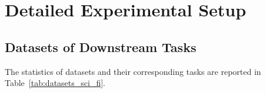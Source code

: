 \documentclass[11pt]{article}
\begin{document}
\begin{table*}[t]
    \centering
    \caption{Results of VarMAE on all downstream tasks against different masking ratios of pre-training.
    For each dataset, we run three random seeds and report the average result of the test sets.
    We report the micro-average F1 score for CLS and TM, entity-level F1 score for NER, and token-level F1 score for SE.
    }
    \label{tab:pretrain_mask_full}
\end{table*}



\section{Detailed Experimental Setup} \label{sec:appendix_exper_setups}
\subsection{Datasets of Downstream Tasks}
\label{sec:appendix_dataset}
The statistics of datasets and their corresponding tasks are reported in Table~\ref{tab:datasets_sci_fi}.
\end{document}
